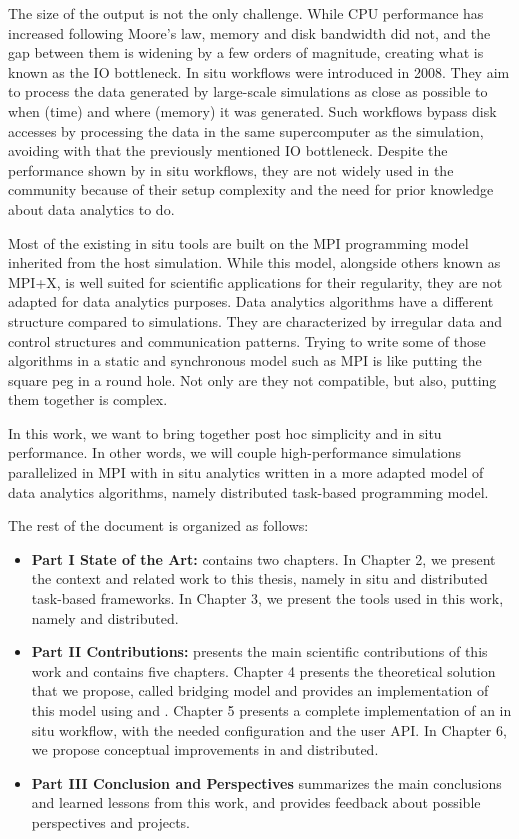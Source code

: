 The size of the output is not the only challenge. While CPU performance has increased following Moore's law, memory and disk bandwidth did not, and the gap between them is widening by a few orders of magnitude, creating what is known as the IO bottleneck. 
In situ workflows were introduced in 2008. They aim to process the data generated by large-scale simulations as close as possible to when (time) and where (memory) it was generated. Such workflows bypass disk accesses by processing the data in the same supercomputer as the simulation, avoiding with that the previously mentioned IO bottleneck. 
Despite the performance shown by in situ workflows, they are not widely used in the community because of their setup complexity and the need for prior knowledge about data analytics to do.  

Most of the existing in situ tools are built on the MPI programming model inherited from the host simulation. While this model, alongside others known as MPI+X, is well suited for scientific applications for their regularity, they are not adapted for data analytics purposes. 
Data analytics algorithms have a different structure compared to simulations. They are characterized by irregular data and control structures and communication patterns. Trying to write some of those algorithms in a static and synchronous model such as MPI is like putting the square peg in a round hole. Not only are they not compatible, but also, putting them together is complex.

In this work, we want to bring together post hoc simplicity and in situ performance. In other words, we will couple high-performance simulations parallelized in MPI with in situ analytics written in a more adapted model of data analytics algorithms, namely distributed task-based programming model. 

The rest of the document is organized as follows: 
\begin{itemize}

    \item \textbf{Part I State of the Art:} contains two chapters. In Chapter 2, we present the context and related work to this thesis, namely in situ and distributed task-based frameworks. In Chapter 3, we present the tools used in this work, namely \pdi and \dask distributed.    

    \item \textbf{Part II Contributions:} presents the main scientific contributions of this work and contains five chapters. Chapter 4 presents the theoretical solution that we propose, called \deisa bridging model and provides an implementation of this model using \dask and \pdi. Chapter 5 presents a complete implementation of an in situ workflow, with the needed configuration and the user API. In Chapter 6, we propose conceptual improvements in \deisa and \dask distributed. 

    \item \textbf{Part III Conclusion and Perspectives} summarizes the main conclusions and learned lessons from this work, and provides feedback about possible perspectives and projects. 
    
\end{itemize}
    
